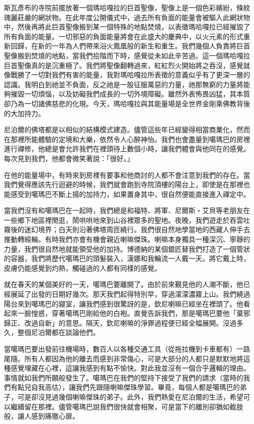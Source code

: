 斯瓦彥布的寺院前擺放著一個瑪哈嘎拉的巨首聖像，聖像上是一個色彩繽紛，條紋瑰麗莊嚴的網狀物。在此年度公開儀式中，過去所有負面的能量會被驅入此網狀物中，然後再將此巨首聖像搬到某一個特殊的地點焚燒，以表徵瑪哈嘎拉已經摧毀了所有負面的能量。一切邪惡的負面能量將會在此盛大的慶典中，以火元素的形式重新回歸，在新的一年為人們帶來浴火鳳凰般的新生和重生。我們幾個人負責將巨首聖像搬到焚燒的地點，當我們拾階而下時，感覺從未如此辛苦過。這一個瑪哈嘎拉巨首聖像真的是沉重極了。我們將聖像翻轉過來，紅紅烈火開始將之吞沒，感覺就像戰勝了一切對我們有害的能量，我對瑪哈嘎拉所表徵的意義似乎有了更深一層的認識。我明白到祂並不負面，反之祂是一股征服萬惡的力量，祂那無窮的力量將能夠摧毀一切煩惱，以及妨礙我們成長的一切外境障礙。雖然外表怖畏凶猛，其本質卻乃為一切諸佛慈悲的化現。今天，瑪哈嘎拉與其能量場是全世界金剛乘佛教背後的大加持力。

尼泊爾的佛塔都是以相似的結構模式建造。儘管這些年已經變得相當商業化，然而在那裡所能體驗的定境和大樂，依然令人心醉神怡。我們也會盡量到噶瑪巴的房裡進行禪修，他總是會允許我們在裡頭待上數個小時，讓我們體會與他同在的感覺。每次見到我們，他都會微笑著說：「很好。」


在他的能量場中，有時來到房裡有要事和他商討的人都不會注意到我們的存在。當我們覺得應該先行迴避的時候，我們就會跑到寺院頂樓的陽台上，即使是在那裡也能感受到噶瑪巴不斷上揚的加持力，如果置身其中，很自然便能直接進入禪定中。

當我們沒有和噶瑪巴在一起時，我們總是和福特、將軍、尼爾斯‧艾貝等老朋友在一些鄉下地區裡閒逛，鬧哄哄地來到山谷裡眾多的聖地。夜晚，我們遊走於吞雲吐霧後的迷幻境界；白天則沿著佛塔周匝繞行。我們很自然地學當地的西藏人伸手去推動轉經輪。有時我們亦會有機會親近喇嘛傑珠。喇嘛本身獨具一種深沉、寧靜的力量，我們很自然地就能領受他的加持。博德納的某個銀匠替我們打造了一個管狀的容器，我們將歷代噶瑪巴的頭髮裝入，漢娜和我輪流一人戴一天。將它戴上時，皮膚仍能感覺到灼熱，觸碰過的人都有同樣的感覺。

就在春天的某個美好的一天，噶瑪巴要離開了。由於前來覲見他的人潮不斷，他已經展延了出發的日期好幾次。那天我們起得特別早，穿過濛濛濃霧上山。我們繞過陽台來到噶瑪巴的寢室，讓我們感到很驚訝的是，欽尼喇嘛已經坐在裡頭了。他看起來一臉惶惑，穿著噶瑪巴剛給他的白袍。直覺告訴我們，那是噶瑪巴要他「棄邪歸正、改過自新」的意思。隔天，欽尼喇嘛的淨罪過程便已經全幅展開。沒過多久，整個尼泊爾都在談論他們。

當噶瑪巴要出發前往機場時，數百人以各種交通工具（從拖拉機到卡車都有）一路尾隨。所有人都因為他的離去而感到非常傷心，可是大部分的人都只是默默地將這種感覺埋藏在心裡，這讓我感到有點不愉快。對此我並沒有一個合乎邏輯的理由。事情就如我們所願般發生了。噶瑪巴在我們的堅持下接受了我們的請求（當時的我們有點兒自我高估），讓我們先跟隨喇嘛傑珠學習。畢竟，每個人都是噶瑪巴的弟子，可是卻沒見過幾個喇嘛傑珠的弟子。此外，我們熱愛在尼泊爾的生活，希望可以繼續留在那裡。儘管噶瑪巴說我們很快就會相聚，可是當下的離別卻猶如截肢般，讓人感到痛徹心扉。

